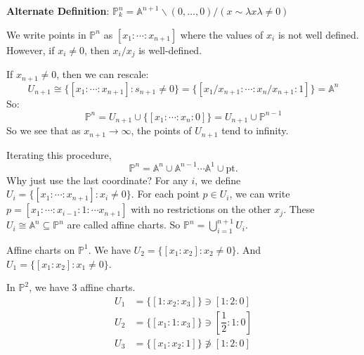 \documentclass{report}
\begin{document}
\textbf{Alternate Definition}: $\mathbb{P}_{k}^{n} = \mathbb{A}^{n + 1}\backslash (0, \ldots, 0) / (x \sim\lambda x \lambda \neq 0)$

We write points in $\mathbb{P}^{n}$ as $[x_{1} : \cdots:x_{n + 1}]$ where the values of $x_{i}$ is not well defined. However, if $x_{i} \neq 0$, then $x_{i}/x_{j}$ is well-defined.

If $x_{n + 1} \neq 0$, then we can rescale:
    \begin{equation*}
        U_{n + 1} \cong\{[x_{1} : \cdots: x_{n + 1}] : s_{n + 1} \neq 0\} = \{[x_{1}/x_{n + 1} : \cdots: x_{n}/ x_{n + 1} : 1]\} = \mathbb{A}^{n}
    \end{equation*}
So:
    \begin{equation*}
        \mathbb{P}^{n} = U_{n + 1} \cup\{[x_{1} : \cdots:x_{n}: 0]\} = U_{n + 1} \cup \mathbb{P}^{n - 1}
    \end{equation*}
So we see that as $x_{n + 1} \rightarrow \infty$, the points of $U_{n + 1}$ tend to infinity.

Iterating this procedure, 
    \begin{equation*}
        \mathbb{P}^{n} = \mathbb{A}^{n} \cup \mathbb{A}^{n - 1} \cdots \mathbb{A}^{1} \cup \text{pt}.
    \end{equation*}
Why just use the last coordinate? For any $i$, we define $U_{i} = \{[x_{1} : \cdots: x_{n + 1}]: x_{i} \neq 0\}$. For each point $p \in U_{i}$, we can write $p = [x_{1} : \cdots: x_{i - 1} : 1 : \cdots x_{n + 1}]$ with no restrictions on the other $x_{j}$. These $U_{i} \cong \mathbb{A}^{n} \subseteq \mathbb{P}^{n}$ are called affine charts. So $\mathbb{P}^{n} = \bigcup_{i = 1}^{n + 1}U_{i}$.

\begin{examples}
    \begin{example}
        Affine charts on $\mathbb{P}^{1}$. We have $U_{2} = \{[x_{1} : x_{2}] : x_{2} \neq 0\}$. And $U_{1} = \{[x_{1}: x_{2}] : x_{1} \neq 0\}$.
    \end{example}
    \begin{example}
        In $\mathbb{P}^{2}$, we have $3$ affine charts. 
            \begin{align*}
                U_{1} &= \{[1: x_{2} : x_{3}]\} \ni [1 : 2: 0]            \\
                U_{2} &= \{[x_{1} : 1 : x_{3}]\} \ni [\dfrac{1}{2}: 1 :0] \\
                U_{3} &= \{[x_{1} : x_{2} : 1]\} \not\ni [1 : 2 : 0]        
            \end{align*}
    \end{example}
\end{examples}
\end{document}
